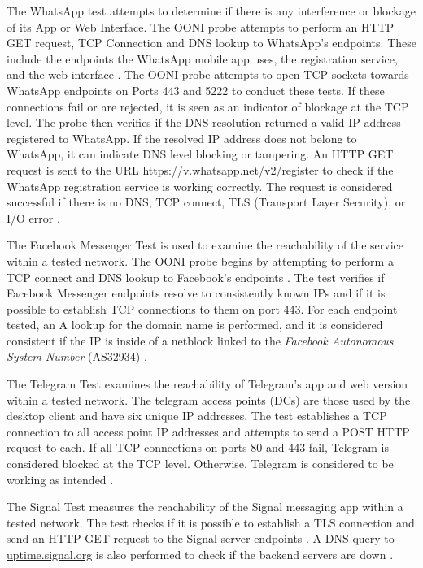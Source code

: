 The WhatsApp test attempts to determine if there is any interference or blockage of its App or Web Interface. The OONI probe attempts to perform an HTTP GET request, TCP Connection and DNS lookup to WhatsApp's endpoints. These include the endpoints the WhatsApp mobile app uses, the registration service, and the web interface \cite{ooniWhatsAppTest}. The OONI probe attempts to open TCP sockets towards WhatsApp endpoints on Ports 443 and 5222 to conduct these tests. If these connections fail or are rejected, it is seen as an indicator of blockage at the TCP level. The probe then verifies if the DNS resolution returned a valid IP address registered to WhatsApp. If the resolved IP address does not belong to WhatsApp, it can indicate DNS level blocking or tampering. An HTTP GET request is sent to the URL \url{https://v.whatsapp.net/v2/register} to check if the WhatsApp registration service is working correctly. The request is considered successful if there is no DNS, TCP connect, TLS (Transport Layer Security), or I/O error \cite{WhatsAppTestGitHub}. 

The Facebook Messenger Test is used to examine the reachability of the service within a tested network. The OONI probe begins by attempting to perform a TCP connect and DNS lookup to Facebook's endpoints \cite{ooniFacebookMessenger}. The test verifies if Facebook Messenger endpoints resolve to consistently known IPs and if it is possible to establish TCP connections to them on port 443. For each endpoint tested, an A lookup for the domain name is performed, and it is considered consistent if the IP is inside of a netblock linked to the \textit{Facebook Autonomous System Number} (AS32934) \cite{FacebookTestGitHub}.

The Telegram Test examines the reachability of Telegram's app and web version within a tested network. The telegram access points (DCs) are those used by the desktop client and have six unique IP addresses. The test establishes a TCP connection to all access point IP addresses and attempts to send a POST HTTP request to each. If all TCP connections on ports 80 and 443 fail, Telegram is considered blocked at the TCP level. Otherwise, Telegram is considered to be working as intended \cite{TelegramTestGitHub}. 

The Signal Test measures the reachability of the Signal messaging app within a tested network. The test checks if it is possible to establish a TLS connection and send an HTTP GET request to the Signal server endpoints \cite{ooniSignalTest}. A DNS query to \url{uptime.signal.org} is also performed to check if the backend servers are down \cite{SignalTestGitHub}. 

